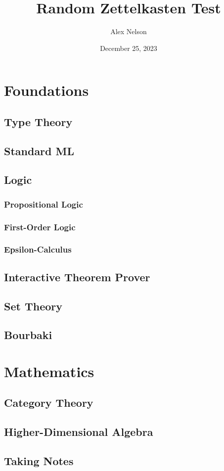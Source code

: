 \documentclass[dvipsnames,HTML]{amsbook}
\title{Random Zettelkasten Test}
\author{Alex Nelson}
\date{December 25, 2023}
\begin{document}
\frontmatter
\maketitle
\tableofcontents
\mainmatter
\vfill\eject

\part{Foundations}
\chapter{Type Theory}


\chapter{Standard ML}


\chapter{Logic}
\section{Propositional Logic}

\section{First-Order Logic}

\section{Epsilon-Calculus}


\chapter{Interactive Theorem Prover}


\chapter{Set Theory}

% 

\chapter{Bourbaki}


\part{Mathematics}

\chapter{Category Theory}

\chapter{Higher-Dimensional Algebra}


\backmatter
\appendix
\chapter{Taking Notes}


\nocite{*}

\end{document}

